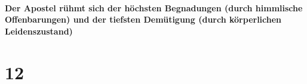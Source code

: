 \hypertarget{der-apostel-ruxfchmt-sich-der-huxf6chsten-begnadungen-durch-himmlische-offenbarungen-und-der-tiefsten-demuxfctigung-durch-kuxf6rperlichen-leidenszustand}{%
\paragraph{Der Apostel rühmt sich der höchsten Begnadungen (durch
himmlische Offenbarungen) und der tiefsten Demütigung (durch
körperlichen
Leidenszustand)}\label{der-apostel-ruxfchmt-sich-der-huxf6chsten-begnadungen-durch-himmlische-offenbarungen-und-der-tiefsten-demuxfctigung-durch-kuxf6rperlichen-leidenszustand}}

\hypertarget{section-11}{%
\section{12}\label{section-11}}

